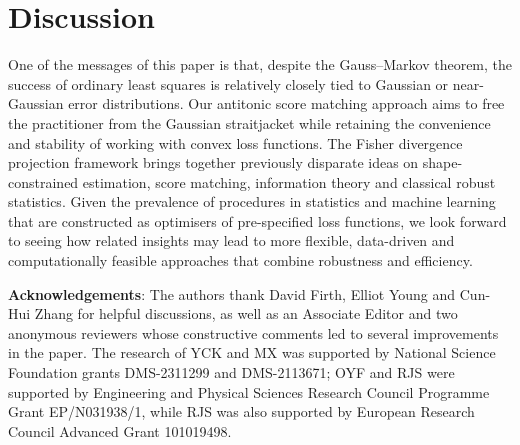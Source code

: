 \documentclass[a4paper]{article}
\theoremstyle{definition}
\begin{document}


\section{Discussion}

One of the messages of this paper is that, despite the Gauss--Markov theorem, the success of ordinary least squares is relatively closely tied to Gaussian or near-Gaussian error distributions.  Our antitonic score matching approach aims to free the practitioner from the Gaussian straitjacket while retaining the convenience and stability of working with convex loss functions.  The Fisher divergence projection framework brings together previously disparate ideas on shape-constrained estimation, score matching, information theory and classical robust statistics.  Given the prevalence of procedures in statistics and machine learning that are constructed as optimisers of pre-specified loss functions, we look forward to seeing how related insights may lead to more flexible, data-driven and computationally feasible approaches that combine robustness and efficiency.

\medskip
\noindent
\textbf{Acknowledgements}: The authors thank David Firth, Elliot Young and Cun-Hui Zhang for helpful discussions, as well as an Associate Editor and two anonymous reviewers whose constructive comments led to several improvements in the paper. The research of YCK and MX was supported by National Science Foundation grants DMS-2311299 and DMS-2113671; OYF and RJS were supported by Engineering and Physical Sciences Research Council Programme Grant EP/N031938/1, while RJS was also supported by European Research Council Advanced Grant 101019498.
\end{document}
